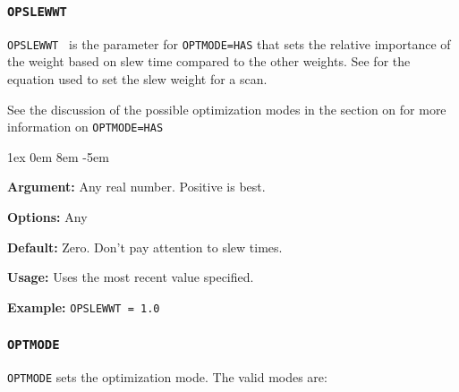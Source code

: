 \documentclass{report}
\newcommand{\rcwbox}[5]{
  \begin{list}{}{\parsep 1ex  \itemsep 0em
                 \leftmargin 8em  \itemindent -5em }
    \item {\bf Argument:} #1
    \item {\bf Options:}  #2
    \item {\bf Default:}  #3
    \item {\bf Usage:}    #4
    \item {\bf Example:}  #5
  \end{list}
}
\begin{document}
\subsubsection{\label{MP:OPSLEWWT}{\tt OPSLEWWT}}

{\tt OPSLEWWT } is the parameter for {\tt OPTMODE=HAS} that sets
the relative importance of the weight based on slew time compared to
the other weights.  See  for
the equation used to set the slew weight for a scan.

See the discussion of the possible optimization modes in the section
on  for more information on
{\tt OPTMODE=HAS}

\rcwbox
{Any real number.  Positive is best.}
{Any}
{Zero. Don't pay attention to slew times.}
{Uses the most recent value specified.}
{{\tt OPSLEWWT = 1.0}}


\subsubsection{\label{MP:OPTMODE}{\tt OPTMODE}}

{\tt OPTMODE} sets the optimization mode.  The valid modes are:
\end{document}
